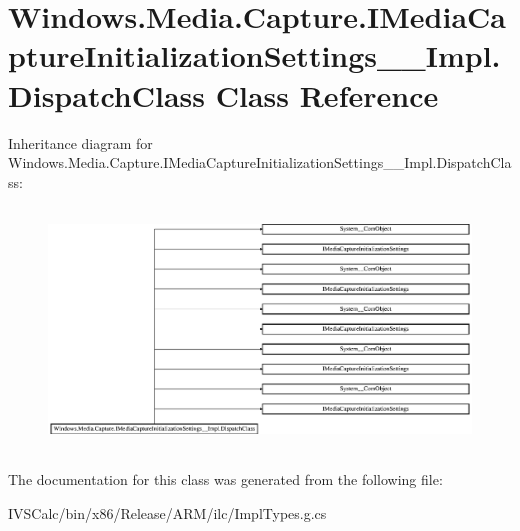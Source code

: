 \hypertarget{class_windows_1_1_media_1_1_capture_1_1_i_media_capture_initialization_settings_____impl_1_1_dispatch_class}{}\section{Windows.\+Media.\+Capture.\+I\+Media\+Capture\+Initialization\+Settings\+\_\+\+\_\+\+Impl.\+Dispatch\+Class Class Reference}
\label{class_windows_1_1_media_1_1_capture_1_1_i_media_capture_initialization_settings_____impl_1_1_dispatch_class}
Inheritance diagram for Windows.\+Media.\+Capture.\+I\+Media\+Capture\+Initialization\+Settings\+\_\+\+\_\+\+Impl.\+Dispatch\+Class\+:\begin{figure}[H]
\begin{center}
\leavevmode
\includegraphics[height=6.497890cm]{class_windows_1_1_media_1_1_capture_1_1_i_media_capture_initialization_settings_____impl_1_1_dispatch_class}
\end{center}
\end{figure}


The documentation for this class was generated from the following file\+:\begin{DoxyCompactItemize}
\item 
I\+V\+S\+Calc/bin/x86/\+Release/\+A\+R\+M/ilc/Impl\+Types.\+g.\+cs\end{DoxyCompactItemize}
